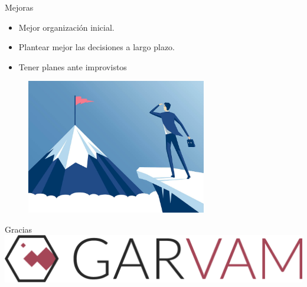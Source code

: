 \documentclass{beamer}
\begin{document}
\begin{frame}{Mejoras}
	\begin{itemize}
 	 \item {
  		Mejor organización inicial.
 	 }
 	 \item {
  		Plantear mejor las decisiones a largo plazo.
 	 }
 	 \item {
		Tener planes ante improvistos
 	 }
 	
  \end{itemize}
  	\begin{figure}[H]
  		\includegraphics[width=0.7\textwidth, height=0.5\textheight]{images_latex/largoplazo}
  	\end{figure}
\end{frame}

\begin{frame}{Gracias}
	\centering
	\includegraphics[width=0.6\paperwidth, height = 0.2\paperheight]{images_latex/logo}
\end{frame}


\end{document}
